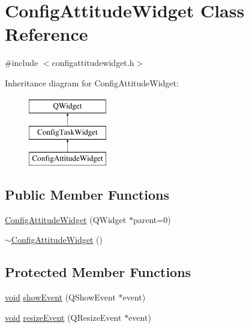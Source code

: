\hypertarget{class_config_attitude_widget}{\section{Config\-Attitude\-Widget Class Reference}
\label{class_config_attitude_widget}
}


{\ttfamily \#include $<$configattitudewidget.\-h$>$}

Inheritance diagram for Config\-Attitude\-Widget\-:\begin{figure}[H]
\begin{center}
\leavevmode
\includegraphics[height=3.000000cm]{class_config_attitude_widget}
\end{center}
\end{figure}
\subsection*{Public Member Functions}
\begin{DoxyCompactItemize}
\item 
\hyperlink{group___config_plugin_ga56d10f1f43df3e0490f765a0e36eba72}{Config\-Attitude\-Widget} (Q\-Widget $\ast$parent=0)
\item 
\hyperlink{group___config_plugin_ga6a068a00a4c75c776ee941255797e705}{$\sim$\-Config\-Attitude\-Widget} ()
\end{DoxyCompactItemize}
\subsection*{Protected Member Functions}
\begin{DoxyCompactItemize}
\item 
\hyperlink{group___u_a_v_objects_plugin_ga444cf2ff3f0ecbe028adce838d373f5c}{void} \hyperlink{group___config_plugin_ga3a79765d89dea1538f1c4393e19a2f39}{show\-Event} (Q\-Show\-Event $\ast$event)
\item 
\hyperlink{group___u_a_v_objects_plugin_ga444cf2ff3f0ecbe028adce838d373f5c}{void} \hyperlink{group___config_plugin_ga6422c7d13c247e91f9f9f9bc1d5a8531}{resize\-Event} (Q\-Resize\-Event $\ast$event)
\end{DoxyCompactItemize}
